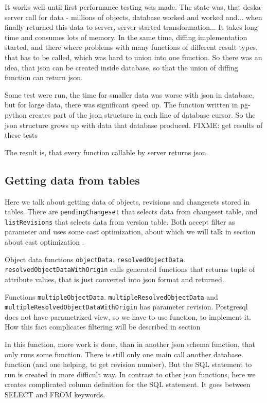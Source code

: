 \documentclass[deska]{subfiles}
\begin{document}
It works well until first performance testing was made. The state was, that deska-server call for data - millions of objects,
database worked and worked and... when finally returned this data to server, server started transformation... It takes long time
and consumes lots of memory.
In the same time, diffing implementation started, and there where problems with many functions of different result types,
that has to be called, which was hard to union into one function.
So there was an idea, that json can be created inside database, so that the union of diffing function can return json.

Some test were run, the time for smaller data was worse with json in database, but for large data, there was significant
speed up. The function written in pg-python creates part of the json structure in each line of database cursor.
So the json structure grows up with data that database produced.
FIXME: get results of these tests

The result is, that every function callable by server returns json.

\subsection{Getting data from tables}
\label{sec:data-functions}
Here we talk about getting data of objects, revisions and changesets stored in tables.
There are {\tt pendingChangeset} that selects data from changeset table, and {\tt listRevisions} that selects data from version table.
Both accept filter as parameter and uses some cast optimization, about which we will talk in section about cast
optimization .

Object data functions {\tt objectData}. {\tt resolvedObjectData}. {\tt resolvedObjectDataWithOrigin} calls generated functions 
that returns tuple of attribute values, that is just converted into json format and returned. 

Functions {\tt multipleObjectData}. {\tt multipleResolvedObjectData} and {\tt multipleResolvedObjectDataWithOrigin} has parameter revision.
Postgresql does not have parametrized view, so we have to use function, to implement it. How this fact complicates filtering will
be described in section 

In this function, more work is done, than in another json schema function, that only runs some function.
There is still only one main call another database function (and one helping, to get revision number).
But the SQL statement to run is created in more difficult way. In contrast to other json functions,
here we creates complicated column definition for the SQL statement. It goes between SELECT and FROM keywords.
\end{document}
